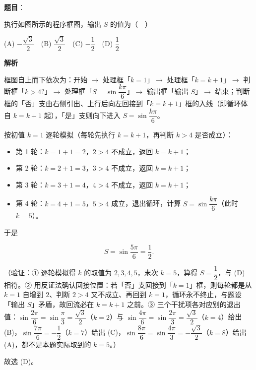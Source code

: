 \begin{answer}

\textbf{题目}：

执行如图所示的程序框图，输出 \(S\) 的值为（　）
\nopagebreak[4]
\begin{center}\end{center}
\nopagebreak[4]
(A) \(-\dfrac{\sqrt{3}}{2}\)　(B) \(\dfrac{\sqrt{3}}{2}\)　(C) \(-\dfrac{1}{2}\)　(D) \(\dfrac{1}{2}\)

\textbf{解析}

框图自上而下依次为：开始 \(\rightarrow\) 处理框「\(k=1\)」\(\rightarrow\) 处理框「\(k=k+1\)」\(\rightarrow\) 判断框「\(k>4?\)」\(\rightarrow\) 处理框「\(S=\sin\dfrac{k\pi}{6}\)」\(\rightarrow\) 输出框「输出 \(S\)」\(\rightarrow\) 结束；判断框的「否」支由右侧引出、上行后向左回接到「\(k=k+1\)」框的入线（即循环体自 \(k=k+1\) 起），「是」支则向下进入 \(S=\sin\dfrac{k\pi}{6}\)。

按初值 \(k=1\) 逐轮模拟（每轮先执行 \(k=k+1\)，再判断 \(k>4\) 是否成立）：

\begin{itemize}
\item 第 1 轮：\(k=1+1=2\)，\(2>4\) 不成立，返回 \(k=k+1\)；
\item 第 2 轮：\(k=2+1=3\)，\(3>4\) 不成立，返回 \(k=k+1\)；
\item 第 3 轮：\(k=3+1=4\)，\(4>4\) 不成立，返回 \(k=k+1\)；
\item 第 4 轮：\(k=4+1=5\)，\(5>4\) 成立，退出循环，计算 \(S=\sin\dfrac{k\pi}{6}\)（此时 \(k=5\)）。
\end{itemize}

于是

\nopagebreak[4]
\[
S=\sin\dfrac{5\pi}{6}=\dfrac12.
\]

（验证：① 逐轮模拟得 \(k\) 的取值为 \(2,3,4,5\)，末次 \(k=5\)，算得 \(S=\dfrac12\)，与 (D) 相符。② 用反证法确认回接位置：若「否」支回接到「\(k=1\)」框，则每轮都是从 \(k=1\) 自增到 \(2\)、判断 \(2>4\) 又不成立、再回到 \(k=1\)，循环永不终止，与题设「输出 \(S\)」矛盾，故回流必在 \(k=k+1\) 之前。③ 三个干扰项各对应别的退出值：\(\sin\dfrac{2\pi}{6}=\sin\dfrac{\pi}{3}=\dfrac{\sqrt{3}}{2}\)（\(k=2\)）与 \(\sin\dfrac{4\pi}{6}=\sin\dfrac{2\pi}{3}=\dfrac{\sqrt{3}}{2}\)（\(k=4\)）给出 (B)，\(\sin\dfrac{7\pi}{6}=-\dfrac12\)（\(k=7\)）给出 (C)，\(\sin\dfrac{8\pi}{6}=\sin\dfrac{4\pi}{3}=-\dfrac{\sqrt{3}}{2}\)（\(k=8\)）给出 (A)，都不是本题实际取到的 \(k=5\)。）

故选 (D)。


\end{answer}

